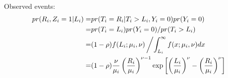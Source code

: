 \documentclass{article}
\begin{document}
Observed events:
\begin{align*}
pr(R_i, Z_i=1 | L_i) =& pr(T_i = R_i | T_i > L_i, Y_i =0)  pr(Y_i = 0) 
\\
=& 
 pr(T_i = L_i) pr(Y_i = 0) /pr(T_i > L_i) \\
=&
 (1-\rho) f(L_i ; \mu_i, \nu) \left/ \int_{L_i}^\infty f(x;\mu_i, \nu) dx  \right.\\
=&
 (1-\rho) \frac{\nu}{\mu_i} \left(\frac{R_i}{\mu_i}\right)^{\nu-1} \exp\left[\left(\frac{L_i}{\mu_i}\right)^\nu-\left(\frac{R_i}{\mu_i}\right)^\nu\right]
\end{align*}
\end{document}
